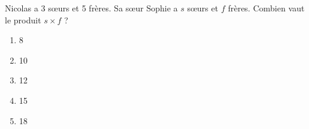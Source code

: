 Nicolas a 3 s\oe urs et 5 frères. Sa s\oe ur Sophie a $s$ s\oe urs et $f$ frères. Combien vaut le produit $s\times f$ ?
\begin{multicols}{5}
\begin{enumerate}[A/]
\item 8
\item 10
\item 12
\item 15
\item 18
\end{enumerate}  
\end{multicols}

